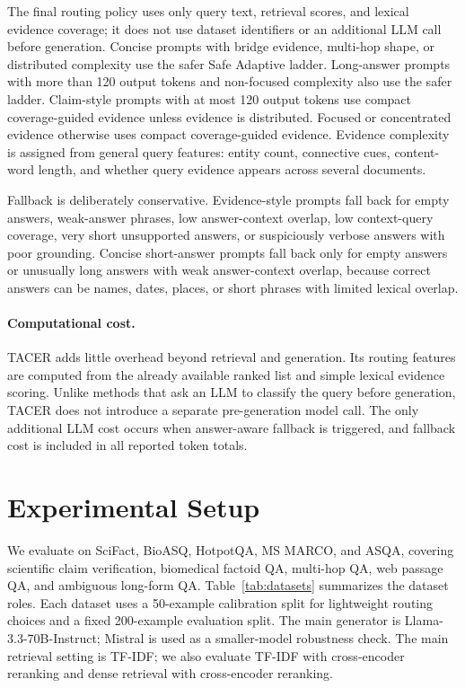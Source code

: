 \documentclass[11pt]{article}
\begin{document}
The final routing policy uses only query text, retrieval scores, and lexical evidence coverage; it does not use dataset identifiers or an additional LLM call before generation. Concise prompts with bridge evidence, multi-hop shape, or distributed complexity use the safer Safe Adaptive ladder. Long-answer prompts with more than 120 output tokens and non-focused complexity also use the safer ladder. Claim-style prompts with at most 120 output tokens use compact coverage-guided evidence unless evidence is distributed. Focused or concentrated evidence otherwise uses compact coverage-guided evidence. Evidence complexity is assigned from general query features: entity count, connective cues, content-word length, and whether query evidence appears across several documents.

Fallback is deliberately conservative. Evidence-style prompts fall back for empty answers, weak-answer phrases, low answer-context overlap, low context-query coverage, very short unsupported answers, or suspiciously verbose answers with poor grounding. Concise short-answer prompts fall back only for empty answers or unusually long answers with weak answer-context overlap, because correct answers can be names, dates, places, or short phrases with limited lexical overlap.

\paragraph{Computational cost.}
TACER adds little overhead beyond retrieval and generation. Its routing features are computed from the already available ranked list and simple lexical evidence scoring. Unlike methods that ask an LLM to classify the query before generation, TACER does not introduce a separate pre-generation model call. The only additional LLM cost occurs when answer-aware fallback is triggered, and fallback cost is included in all reported token totals.

\section{Experimental Setup}

We evaluate on SciFact, BioASQ, HotpotQA, MS MARCO, and ASQA, covering scientific claim verification, biomedical factoid QA, multi-hop QA, web passage QA, and ambiguous long-form QA. Table~\ref{tab:datasets} summarizes the dataset roles. Each dataset uses a 50-example calibration split for lightweight routing choices and a fixed 200-example evaluation split. The main generator is Llama-3.3-70B-Instruct; Mistral is used as a smaller-model robustness check. The main retrieval setting is TF-IDF; we also evaluate TF-IDF with cross-encoder reranking and dense retrieval with cross-encoder reranking.
\end{document}
